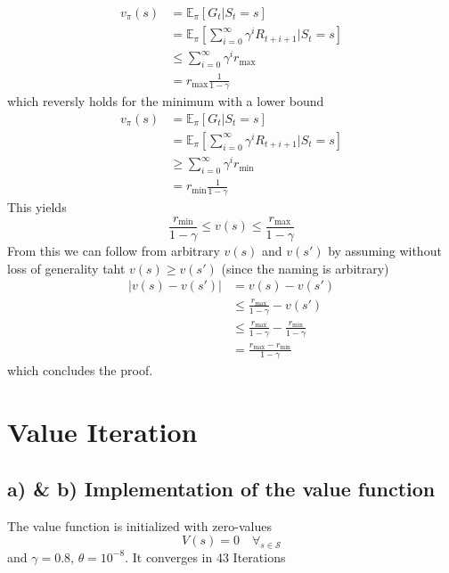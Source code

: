 \documentclass{article}
\begin{document}
\begin{align}
    v_\pi(s) &=  \mathbb{E}_\pi[G_t | S_t = s] \\
    &= \mathbb{E}_\pi [\sum_{i=0}^\infty \gamma^i R_{t+i+1}| S_t = s] \\
    &\leq \sum_{i=0}^\infty \gamma^i r_{\text{max}} \\
    &=r_{\text{max}} \frac{1}{1 - \gamma}
\end{align}
which reversly holds for the minimum with a lower bound
\begin{align}
    v_\pi(s) &=  \mathbb{E}_\pi[G_t | S_t = s] \\
    &= \mathbb{E}_\pi [\sum_{i=0}^\infty \gamma^i R_{t+i+1}| S_t = s] \\
    &\geq \sum_{i=0}^\infty \gamma^i r_{\text{min}} \\
    &=r_{\text{min}} \frac{1}{1 - \gamma}
\end{align}
 This yields
\begin{equation}
    \frac{r_{\text{min}}}{1- \gamma} \leq v(s) \leq \frac{r_{\text{max}}}{1 - \gamma}
\end{equation}
From this we can follow from arbitrary $v(s)$ and $v(s')$ by assuming without loss of generality taht $v(s) \geq v(s')$ (since the naming is arbitrary)
\begin{align}
    |v(s) - v(s')| &= v(s) - v(s') \\
    &\leq  \frac{r_{\text{max}}}{1 - \gamma} - v(s') \\ 
    &\leq  \frac{r_{\text{max}}}{1 - \gamma} -  \frac{r_{\text{min}}}{1- \gamma} \\ 
    &= \frac{r_{\text{max}}-r_{\text{min}}}{1- \gamma}
\end{align}
which concludes the proof.



\section*{Value Iteration}

\subsection*{a) \& b) Implementation of the value function}
The value function is initialized with zero-values 
\begin{equation}
    V(s) = 0 \quad \forall_{s \in \mathcal{S}}
\end{equation}
and $\gamma = 0.8$, $\theta=10^{-8}$. It converges in 43 Iterations
\end{document}

